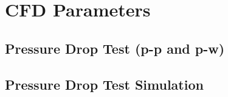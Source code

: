 
\chapter{CFD Parameters}
\label{cap:cfdparameters}

\lipsum[1]

\section{Pressure Drop Test (p-p and p-w)}
\label{sec:pressuredrop}

\lipsum[1]


\section{Pressure Drop Test Simulation}
\label{sec:pressuredropsimulation}

\lipsum[1]
